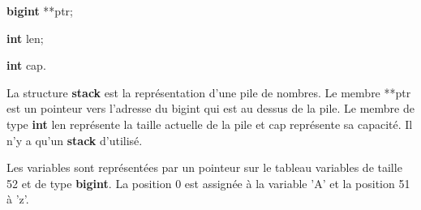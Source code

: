 \documentclass[]{report}
\begin{document}
\begin{normalsize}
	\begin{description}[noitemsep]
		\item \hspace{4mm}\textbf{bigint} **ptr;
		\item \hspace{4mm}\textbf{int} len;
		\item \hspace{4mm}\textbf{int} cap.
	\end{description}
	\par La structure \textbf{stack} est la représentation d'une pile de nombres. Le membre **ptr est un pointeur vers l'adresse du bigint qui est au dessus de la pile. Le membre de type  \textbf{int} len représente la taille actuelle de la pile et cap représente sa capacité. Il n'y a qu'un \textbf{stack} d'utilisé.
		\vspace{4mm}
	\par Les variables sont représentées par un pointeur sur le tableau variables de taille 52 et de type \textbf{bigint}. La position 0 est assignée à la variable 'A' et la position 51 à 'z'.	
	\end{normalsize}
	\newpage
	
\end{document}

